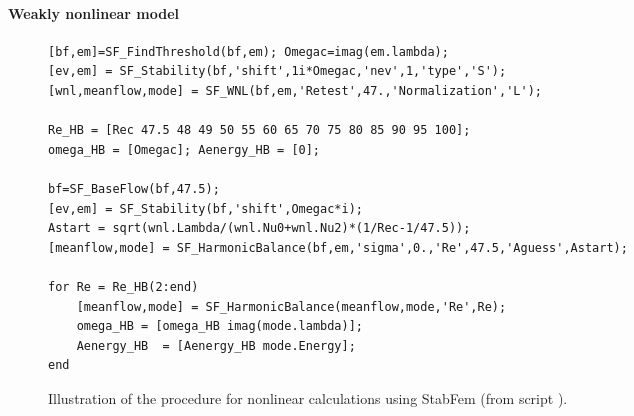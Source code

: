 \documentclass[twocolumn,10pt]{asme2ej}
\begin{document}
\paragraph{Weakly nonlinear model}
\iffalse
\begin{figure*}
\small
\begin{lstlisting}
[bf,em]=SF_FindThreshold(bf,em);
wnl = SF_WNL(bf,em);

Re_HB = [Rec 47.5 48 49 50 55 60 65 70 75 80 85 90 95 100];
omega_HB = [Omegac]; Aenergy_HB = [0]; 

bf=SF_BaseFlow(bf,47.5);
[ev,em] = SF_Stability(bf,'shift',Omegac*i);
Astart = sqrt(wnl.Lambda/(wnl.Nu0+wnl.Nu2)*(1/Rec-1/47.5));
[meanflow,mode] = SF_HarmonicBalance(bf,em,'sigma',0.,'Re',47.5,'Aguess',Astart);

for Re = Re_HB(2:end)
    [meanflow,mode] = SF_HarmonicBalance(meanflow,mode,'Re',Re);
    omega_HB = [omega_HB imag(mode.lambda)];
    Aenergy_HB  = [Aenergy_HB mode.Energy];
end
\end{lstlisting}
\normalsize
\caption{Illustration of the procedure for nonlinear calculations using StabFem (from script {\em SCRIPT\_CYLINDER.m}. }
\label{fig:listingNL}
\end{figure*}
\fi
\begin{figure*}
\small
\begin{lstlisting}
[bf,em]=SF_FindThreshold(bf,em); Omegac=imag(em.lambda);
[ev,em] = SF_Stability(bf,'shift',1i*Omegac,'nev',1,'type','S'); 
[wnl,meanflow,mode] = SF_WNL(bf,em,'Retest',47.,'Normalization','L');

Re_HB = [Rec 47.5 48 49 50 55 60 65 70 75 80 85 90 95 100];
omega_HB = [Omegac]; Aenergy_HB = [0]; 

bf=SF_BaseFlow(bf,47.5);
[ev,em] = SF_Stability(bf,'shift',Omegac*i);
Astart = sqrt(wnl.Lambda/(wnl.Nu0+wnl.Nu2)*(1/Rec-1/47.5));
[meanflow,mode] = SF_HarmonicBalance(bf,em,'sigma',0.,'Re',47.5,'Aguess',Astart);

for Re = Re_HB(2:end)
    [meanflow,mode] = SF_HarmonicBalance(meanflow,mode,'Re',Re);
    omega_HB = [omega_HB imag(mode.lambda)];
    Aenergy_HB  = [Aenergy_HB mode.Energy];
end
\end{lstlisting}
\normalsize
\caption{Illustration of the procedure for nonlinear calculations using StabFem (from script {\color{red}{\em SCRIPT\_CYLINDER\_NONLINEAR.m})}. }
\label{fig:listingNL}
\end{figure*}
\end{document}
